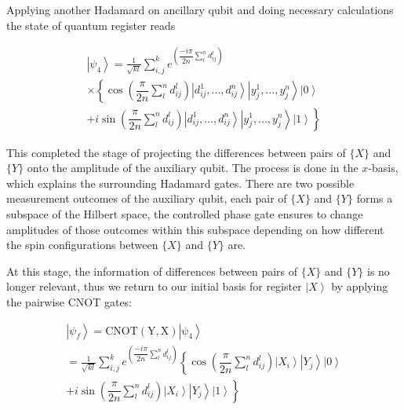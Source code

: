 \documentclass[pra,showkeys,twocolumn,showpacs]{revtex4-1}
\begin{document}
Applying another Hadamard on ancillary qubit and doing necessary calculations the state of quantum register reads

\begin{multline}
    \left| \psi_4 \right\rangle = 
    \frac{1}{\sqrt{kl}} \sum\limits_{i, j}^{k} 
    e^{\left(\dfrac{-i \pi}{2n}\sum\limits_l^n d^l_{ij} \right)}
		\\ \times
        \left\{\cos\left(\dfrac{\pi}{2n}\sum\limits_l^n d^l_{ij} \right)
        \left| d^1_{ij}, \dots, d^n_{ij} \right\rangle 
        \left| y^1_j, \dots, y^n_j \right\rangle 
        \left| 0 \right\rangle\right.
        \\+ 
        \left. i \sin\left(\dfrac{\pi}{2n}\sum\limits_l^n d^l_{ij} \right)
        \left| d^1_{ij}, \dots, d^n_{ij} \right\rangle 
        \left| y^1_j, \dots, y^n_j \right\rangle 
        \left| 1 \right\rangle\right\}
\end{multline}


This completed the stage of projecting the differences between pairs of $\{X\}$ and $\{Y\}$ onto the amplitude of the auxiliary qubit. 
The process is done in the $x$-basis, which explains the surrounding Hadamard gates. 
There are two possible measurement outcomes of the auxiliary qubit, each pair of $\{X\}$ and $\{Y\}$ forms a subspace of the Hilbert space, 
the controlled phase gate ensures to change amplitudes of those outcomes within this subspace depending on how different the spin configurations between $\{X\}$ and $\{Y\}$ are.

At this stage, the information of differences between pairs of $\{X\}$ and $\{Y\}$ is no longer relevant, 
thus we return to our initial basis for register $\left| X \right\rangle$ by applying the pairwise CNOT gates:

\begin{multline}
    \left| \psi_f \right\rangle = 
    \mathrm{CNOT(Y,X)\left| \psi_4 \right\rangle} \\=  
    \frac{1}{\sqrt{kl}}\sum\limits_{i, j}^{k} 
    e^{\left(\dfrac{-i \pi}{2n}\sum\limits_l^n d^l_{ij} \right)}
				\left\{\cos\left(\dfrac{\pi}{2n}\sum\limits_l^n d^l_{ij} \right)
        \left| X_i \right\rangle 
        \left| Y_j \right\rangle 
        \left| 0 \right\rangle\right.
        \\+
        \left. i \sin\left(\dfrac{\pi}{2n}\sum\limits_l^n d^l_{ij} \right)
        \left| X_i \right\rangle 
        \left| Y_j \right\rangle 
        \left| 1 \right\rangle\right\}
\end{multline}
\end{document}
